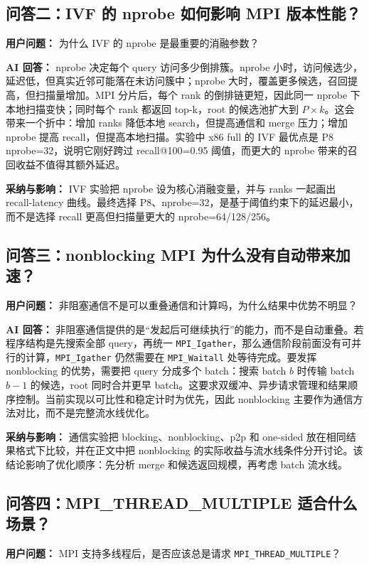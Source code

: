 \documentclass[11pt,a4paper]{article}
\begin{document}
\subsection*{问答二：IVF 的 nprobe 如何影响 MPI 版本性能？}
\textbf{用户问题：} 为什么 IVF 的 nprobe 是最重要的消融参数？

\textbf{AI 回答：} nprobe 决定每个 query 访问多少倒排簇。nprobe 小时，访问候选少，延迟低，但真实近邻可能落在未访问簇中；nprobe 大时，覆盖更多候选，召回提高，但扫描量增加。MPI 分片后，每个 rank 的倒排链更短，因此同一 nprobe 下本地扫描变快；同时每个 rank 都返回 top-k，root 的候选池扩大到 $P\times k$。这会带来一个折中：增加 ranks 降低本地 search，但提高通信和 merge 压力；增加 nprobe 提高 recall，但提高本地扫描。实验中 x86 full 的 IVF 最优点是 P8 nprobe=32，说明它刚好跨过 recall@100=0.95 阈值，而更大的 nprobe 带来的召回收益不值得其额外延迟。

\textbf{采纳与影响：} IVF 实验把 nprobe 设为核心消融变量，并与 ranks 一起画出 recall-latency 曲线。最终选择 P8、nprobe=32，是基于阈值约束下的延迟最小，而不是选择 recall 更高但扫描量更大的 nprobe=64/128/256。

\subsection*{问答三：nonblocking MPI 为什么没有自动带来加速？}
\textbf{用户问题：} 非阻塞通信不是可以重叠通信和计算吗，为什么结果中优势不明显？

\textbf{AI 回答：} 非阻塞通信提供的是“发起后可继续执行”的能力，而不是自动重叠。若程序结构是先搜索全部 query，再统一 \texttt{MPI\_Igather}，那么通信阶段前面没有可并行的计算，\texttt{MPI\_Igather} 仍然需要在 \texttt{MPI\_Waitall} 处等待完成。要发挥 nonblocking 的优势，需要把 query 分成多个 batch：搜索 batch $b$ 时传输 batch $b-1$ 的候选，root 同时合并更早 batch。这要求双缓冲、异步请求管理和结果顺序控制。当前实现以可比性和稳定计时为优先，因此 nonblocking 主要作为通信方法对比，而不是完整流水线优化。

\textbf{采纳与影响：} 通信实验把 blocking、nonblocking、p2p 和 one-sided 放在相同结果格式下比较，并在正文中把 nonblocking 的实际收益与流水线条件分开讨论。该结论影响了优化顺序：先分析 merge 和候选返回规模，再考虑 batch 流水线。

\subsection*{问答四：MPI\_THREAD\_MULTIPLE 适合什么场景？}
\textbf{用户问题：} MPI 支持多线程后，是否应该总是请求 \texttt{MPI\_THREAD\_MULTIPLE}？
\end{document}
